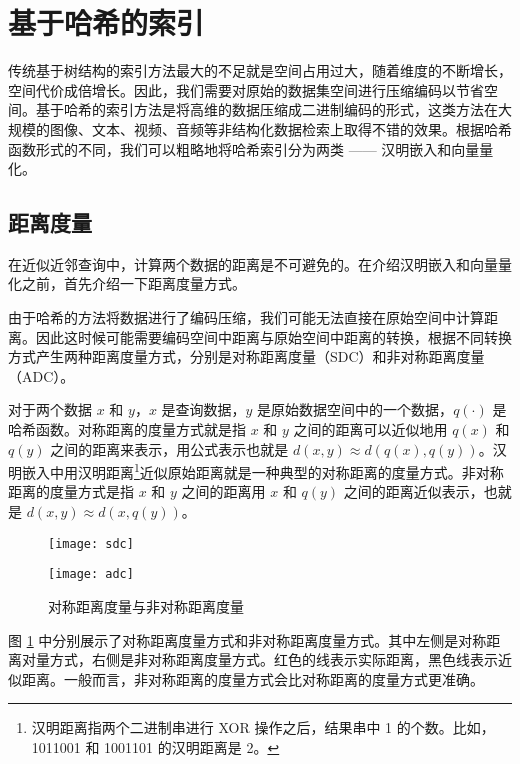 \section{基于哈希的索引}
传统基于树结构的索引方法最大的不足就是空间占用过大，随着维度的不断增长，空间代价成倍增长。因此，我们需要对原始的数据集空间进行压缩编码以节省空间。基于哈希的索引方法是将高维的数据压缩成二进制编码的形式，这类方法在大规模的图像、文本、视频、音频等非结构化数据检索上取得不错的效果。根据哈希函数形式的不同，我们可以粗略地将哈希索引分为两类 —— 汉明嵌入和向量量化。

\subsection{距离度量}
在近似近邻查询中，计算两个数据的距离是不可避免的。在介绍汉明嵌入和向量量化之前，首先介绍一下距离度量方式。

由于哈希的方法将数据进行了编码压缩，我们可能无法直接在原始空间中计算距离。因此这时候可能需要编码空间中距离与原始空间中距离的转换，根据不同转换方式产生两种距离度量方式，分别是对称距离度量（SDC）和非对称距离度量（ADC）。

对于两个数据 $x$ 和 $y$，$x$ 是查询数据，$y$ 是原始数据空间中的一个数据，$q(\cdot)$ 是哈希函数。对称距离的度量方式就是指 $x$ 和 $y$ 之间的距离可以近似地用 $q(x)$ 和 $q(y)$ 之间的距离来表示，用公式表示也就是 $d(x,y) \approx d(q(x),q(y))$。汉明嵌入中用汉明距离\footnote{汉明距离指两个二进制串进行 XOR 操作之后，结果串中 1 的个数。比如，1011001 和 1001101 的汉明距离是 2。}近似原始距离就是一种典型的对称距离的度量方式。非对称距离的度量方式是指 $x$ 和 $y$ 之间的距离用 $x$ 和 $q(y)$ 之间的距离近似表示，也就是 $d(x,y) \approx d(x, q(y))$。
\begin{figure}[htbp]
\centering
\begin{minipage}[t]{0.4\linewidth}
    \centering
    \texttt{[image: sdc]}
\end{minipage}
\hspace{3ex}   %
\begin{minipage}[t]{0.4\linewidth}
    \centering
    \texttt{[image: adc]}
\end{minipage}
\caption{对称距离度量与非对称距离度量}
\label{fig:sdc_adc}
\end{figure}

图 \ref{fig:sdc_adc} 中分别展示了对称距离度量方式和非对称距离度量方式。其中左侧是对称距离对量方式，右侧是非对称距离度量方式。红色的线表示实际距离，黑色线表示近似距离。一般而言，非对称距离的度量方式会比对称距离的度量方式更准确。

